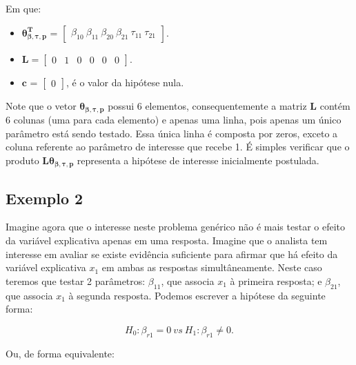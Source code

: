\noindent Em que:

\begin{itemize}
  
  \item $\boldsymbol{\theta_{\beta,\tau,p}^T}$ = $\begin{bmatrix} \beta_{10} \  \beta_{11} \ \beta_{20} \ \beta_{21} \ \tau_{11} \ \tau_{21} \end{bmatrix}$.


\item $\boldsymbol{L} = \begin{bmatrix} 0 & 1 & 0 & 0 & 0 & 0  \end{bmatrix}.$
 
\item $\boldsymbol{c}$ = $\begin{bmatrix} 0 \end{bmatrix}$, é o valor da hipótese nula. 

\end{itemize}

Note que o vetor $\boldsymbol{\theta_{\beta,\tau,p}}$ possui 6 elementos, consequentemente a matriz $\boldsymbol{L}$ contém 6 colunas (uma para cada elemento) e apenas uma linha, pois apenas um único parâmetro está sendo testado. Essa única linha é composta por zeros, exceto a coluna referente ao parâmetro de interesse que recebe 1. É simples verificar que o produto $\boldsymbol{L}\boldsymbol{\theta_{\beta,\tau,p}}$ representa a hipótese de interesse inicialmente postulada.

\subsection{Exemplo 2}

Imagine agora que o interesse neste problema genérico não é mais testar o efeito da variável explicativa apenas em uma resposta. Imagine que o analista tem interesse em avaliar se existe evidência suficiente para afirmar que há efeito da variável explicativa $x_1$ em ambas as respostas simultâneamente. Neste caso teremos que testar 2 parâmetros: $\beta_{11}$, que associa $x_1$ à primeira resposta; e $\beta_{21}$, que associa $x_1$ à segunda resposta. Podemos escrever a hipótese da seguinte forma:

\begin{equation}
H_0: \beta_{r1} = 0 \ vs \ H_1: \beta_{r1} \neq 0.
\end{equation}

Ou, de forma equivalente:

